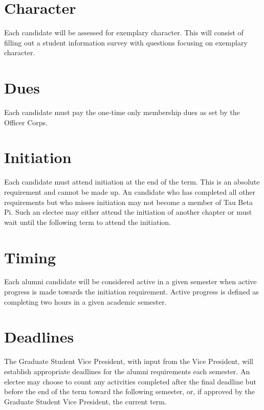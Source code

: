 \section{Character} Each candidate will be assessed for exemplary character. This will consist of filling out a student information survey with questions focusing on exemplary character.
\section{Dues} Each candidate must pay the one-time only membership dues as set by the Officer Corps. 
\section{Initiation} Each candidate must attend initiation at the end of the term. This is an absolute requirement and cannot be made up. An candidate who has completed all other requirements but who misses initiation may not become a member of Tau Beta Pi. Such an electee may either attend the initiation of another chapter or must wait until the following term to attend the initiation.  
\section{Timing} Each alumni candidate will be considered active in a given semester when active progress is made towards the initiation requirement. Active progress is defined as completing two hours in a given academic semester.

\section{Deadlines}  The Graduate Student Vice President, with input from the Vice President, will establish appropriate deadlines for the alumni requirements each semester. An electee may choose to count any activities completed after the final deadline but before the end of the term toward the following semester, or, if approved by the Graduate Student Vice President, the current term. %


